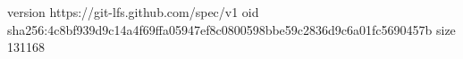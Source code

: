 version https://git-lfs.github.com/spec/v1
oid sha256:4c8bf939d9c14a4f69ffa05947ef8c0800598bbe59c2836d9c6a01fc5690457b
size 131168
